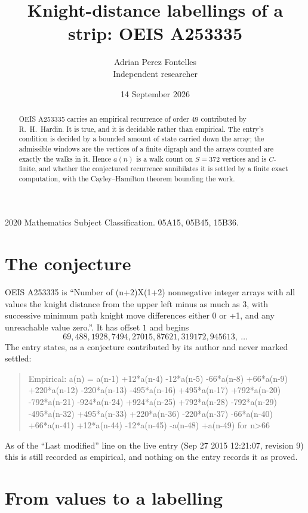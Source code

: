 \documentclass[11pt,a4paper]{article}
\title{Knight-distance labellings of a strip: OEIS A253335}
\author{Adrian Perez Fontelles\\ \small Independent researcher}
\date{14 September 2026}
\theoremstyle{plain}
\theoremstyle{definition}
\begin{document}
\maketitle

\begin{abstract}
OEIS A253335 carries an empirical recurrence of order $49$ contributed by R.~H.~Hardin. It is
true, and it is decidable rather than empirical. The entry's condition is decided by a bounded amount of state carried down the array; the
admissible windows are the vertices of a finite digraph and the arrays counted are exactly the
walks in it. Hence $a(n)$ is a walk count on $S=372$ vertices and is $C$-finite, and whether the
conjectured recurrence annihilates it is settled by a finite exact computation, with the
Cayley--Hamilton theorem bounding the work.
\end{abstract}

\noindent\small 2020 Mathematics Subject Classification. 05A15, 05B45, 15B36.\normalsize

\section{The conjecture}

OEIS A253335 is ``Number of (n+2)X(1+2) nonnegative integer arrays with all values the knight distance from the upper left minus as much as 3, with successive minimum path knight move differences either 0 or +1, and any unreachable value zero.''. It has offset $1$ and begins
\[
69, 488, 1928, 7494, 27015, 87621, 319172, 945613,\ \dots
\]
The entry states, as a conjecture contributed by its author and never marked settled:
\begin{quote}
Empirical: a(n) = a(n-1) +12*a(n-4) -12*a(n-5) -66*a(n-8) +66*a(n-9) +220*a(n-12) -220*a(n-13) -495*a(n-16) +495*a(n-17) +792*a(n-20) -792*a(n-21) -924*a(n-24) +924*a(n-25) +792*a(n-28) -792*a(n-29) -495*a(n-32) +495*a(n-33) +220*a(n-36) -220*a(n-37) -66*a(n-40) +66*a(n-41) +12*a(n-44) -12*a(n-45) -a(n-48) +a(n-49) for n>66
\end{quote}
As of the ``Last modified'' line on the live entry (Sep 27 2015 12:21:07, revision 9) this is still
recorded as empirical, and nothing on the entry records it as proved.

\section{From values to a labelling}
\end{document}

